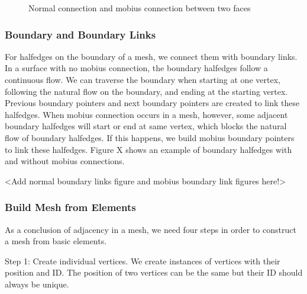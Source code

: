 \documentclass[12pt]{article}
\begin{document}
\begin{figure}[ht]
  \caption{Normal connection and mobius connection between two faces}
  \label{figure:faceConnections}
\end{figure}

\subsubsection{Boundary and Boundary Links}

For halfedges on the boundary of a mesh, we connect them with boundary links. In a surface with no mobius connection, the boundary halfedges follow a continuous flow. We can traverse the boundary when starting at one vertex, following the natural flow on the boundary, and ending at the starting vertex. Previous boundary pointers and next boundary pointers are created to link these halfedges. When mobius connection occurs in a mesh, however, some adjacent boundary halfedges will start or end at same vertex, which blocks the natural flow of boundary halfedges. If this happens, we build mobius boundary pointers to link these halfedges. Figure X shows an example of boundary halfedges with and without mobius connections.

<Add normal boundary links figure and mobius boundary link figures here!>

\subsubsection{Build Mesh from Elements}

As a conclusion of adjacency in a mesh, we need four steps in order to construct a mesh from basic elements.

Step 1: Create individual vertices. We create instances of vertices with their position and ID. The position of two vertices can be the same but their ID should always be unique. 
\end{document}
